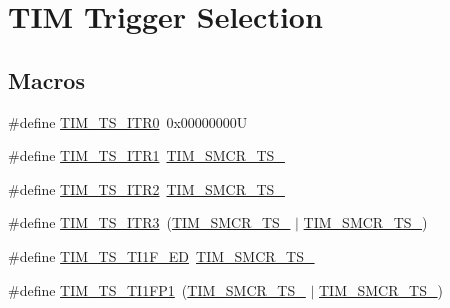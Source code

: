 \hypertarget{group___t_i_m___trigger___selection}{}\section{T\+IM Trigger Selection}
\label{group___t_i_m___trigger___selection}
\subsection*{Macros}
\begin{DoxyCompactItemize}
\item 
\#define \mbox{\hyperlink{group___t_i_m___trigger___selection_gab7cf2b7db3956d4fd1e5a5d84f4891e7}{T\+I\+M\+\_\+\+T\+S\+\_\+\+I\+T\+R0}}~0x00000000U
\item 
\#define \mbox{\hyperlink{group___t_i_m___trigger___selection_gad90fbca297153ca9c0112a67ea2c6cb3}{T\+I\+M\+\_\+\+T\+S\+\_\+\+I\+T\+R1}}~\mbox{\hyperlink{group___peripheral___registers___bits___definition_ga8d1f040f9259acb3c2fba7b0c7eb3d96}{T\+I\+M\+\_\+\+S\+M\+C\+R\+\_\+\+T\+S\+\_}}
\item 
\#define \mbox{\hyperlink{group___t_i_m___trigger___selection_ga8599ba58a5f911d648503c7ac55d4320}{T\+I\+M\+\_\+\+T\+S\+\_\+\+I\+T\+R2}}~\mbox{\hyperlink{group___peripheral___registers___bits___definition_gacb82212fcc89166a43ff97542da9182d}{T\+I\+M\+\_\+\+S\+M\+C\+R\+\_\+\+T\+S\+\_}}
\item 
\#define \mbox{\hyperlink{group___t_i_m___trigger___selection_ga63183e611b91c5847040172c0069514d}{T\+I\+M\+\_\+\+T\+S\+\_\+\+I\+T\+R3}}~(\mbox{\hyperlink{group___peripheral___registers___bits___definition_ga8d1f040f9259acb3c2fba7b0c7eb3d96}{T\+I\+M\+\_\+\+S\+M\+C\+R\+\_\+\+T\+S\+\_}} $\vert$ \mbox{\hyperlink{group___peripheral___registers___bits___definition_gacb82212fcc89166a43ff97542da9182d}{T\+I\+M\+\_\+\+S\+M\+C\+R\+\_\+\+T\+S\+\_}})
\item 
\#define \mbox{\hyperlink{group___t_i_m___trigger___selection_ga8c89554efc693e679c94b5a749af123c}{T\+I\+M\+\_\+\+T\+S\+\_\+\+T\+I1\+F\+\_\+\+ED}}~\mbox{\hyperlink{group___peripheral___registers___bits___definition_gacf0dbaf4a2ec8759f283f82a958ef6a8}{T\+I\+M\+\_\+\+S\+M\+C\+R\+\_\+\+T\+S\+\_}}
\item 
\#define \mbox{\hyperlink{group___t_i_m___trigger___selection_ga38d3514d54bcdb0ea8ac8bd91c5832b5}{T\+I\+M\+\_\+\+T\+S\+\_\+\+T\+I1\+F\+P1}}~(\mbox{\hyperlink{group___peripheral___registers___bits___definition_ga8d1f040f9259acb3c2fba7b0c7eb3d96}{T\+I\+M\+\_\+\+S\+M\+C\+R\+\_\+\+T\+S\+\_}} $\vert$ \mbox{\hyperlink{group___peripheral___registers___bits___definition_gacf0dbaf4a2ec8759f283f82a958ef6a8}{T\+I\+M\+\_\+\+S\+M\+C\+R\+\_\+\+T\+S\+\_}})

\end{DoxyCompactItemize}
